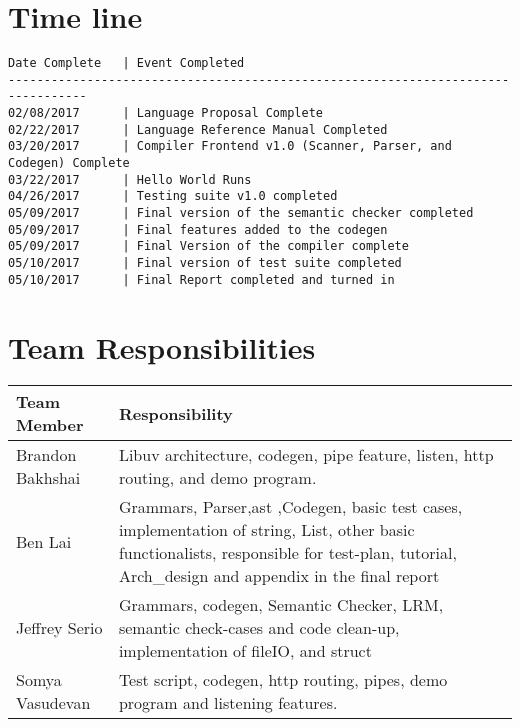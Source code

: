 \documentclass[./Report_main.tex]{subfiles}
\begin{document}
\section{Time line}
\begin{lstlisting} 
Date Complete	| Event Completed
---------------------------------------------------------------------------------
02/08/2017		| Language Proposal Complete
02/22/2017		| Language Reference Manual Completed
03/20/2017		| Compiler Frontend v1.0 (Scanner, Parser, and Codegen) Complete
03/22/2017		| Hello World Runs
04/26/2017		| Testing suite v1.0 completed
05/09/2017		| Final version of the semantic checker completed
05/09/2017		| Final features added to the codegen
05/09/2017		| Final Version of the compiler complete
05/10/2017		| Final version of test suite completed
05/10/2017		| Final Report completed and turned in
\end{lstlisting}
\section{Team Responsibilities}
\begin{tabu} to 1\textwidth { | X[c] | X[c] | }
 \hline
 Team Member & Responsibility \\ 
 \hline
 Brandon Bakhshai & Libuv architecture, codegen, pipe feature, listen, http routing, and demo program.
\\
 \hline
Ben Lai  & Grammars, Parser,ast ,Codegen, basic test cases, implementation of string, List, other basic functionalists, responsible for test-plan, tutorial, Arch_design and appendix in the final report  \\
 \hline
Jeffrey Serio  & Grammars, codegen, Semantic Checker, LRM, semantic check-cases and code clean-up, implementation of fileIO, and struct
\\
\hline
Somya Vasudevan & Test script, codegen, http routing, pipes, demo program and listening features.\\
\hline
\end{tabu}
\end{document}
